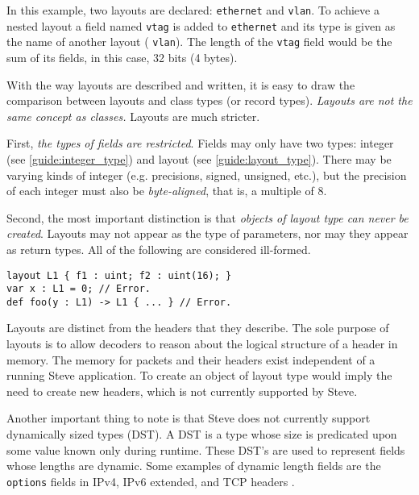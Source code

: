 In this example, two layouts are declared: \texttt{ethernet} and \texttt{vlan}. To
achieve a nested layout a field named \texttt{vtag} is added to
\texttt{ethernet} and its type is given as the name of another layout (
\texttt{vlan}). The length of the \texttt{vtag} field would be the sum of
its fields, in this case, 32 bits (4 bytes).

With the way
layouts are described and written, it is easy to draw the comparison between 
layouts and
class types (or record types). \textit{Layouts are not the same concept as 
classes.} Layouts are much stricter.

First, \textit{the types of fields are restricted}. Fields may only
have two types: integer (see \ref{guide:integer_type}) and layout
(see \ref{guide:layout_type}). There may be varying kinds of integer (e.g.
precisions, signed, unsigned, etc.), but the precision of each integer must also
be \textit{byte-aligned}, that is, a multiple of 8.

Second, the most important distinction is that \textit{objects of layout type
can never be created}. Layouts may not appear as the type of parameters, nor may
they appear as return types. All of the following are considered ill-formed.

\begin{codepage}
\begin{lstlisting}
layout L1 { f1 : uint; f2 : uint(16); }
var x : L1 = 0; // Error.
def foo(y : L1) -> L1 { ... } // Error.
\end{lstlisting}
\end{codepage}

Layouts are distinct from the headers that they describe.
The sole purpose of layouts is to allow decoders to reason about the logical 
structure of a header in memory.
The memory for packets and their headers exist independent of a running Steve 
application.
To create an object of layout type would imply the need to create new headers,
which is not currently supported by Steve.


Another important thing to note is that Steve does not currently support dynamically
sized types (DST). A DST is a type whose size is predicated upon some value
known only during runtime. These DST's are used to represent fields whose
lengths are dynamic. Some examples of dynamic length fields are the
\texttt{options} fields in IPv4, IPv6 extended, and TCP headers \cite{ipv4_std, ipv6_std,
tcp_std}.

